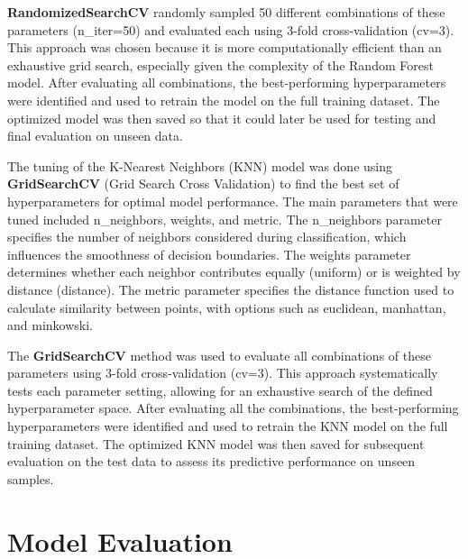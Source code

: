 \textbf{RandomizedSearchCV} randomly sampled 50 different combinations of these parameters (n\_iter=50) and evaluated each using 3-fold cross-validation (cv=3). This approach was chosen because it is more 
computationally efficient than an exhaustive grid search, especially given the complexity of the Random Forest model. After evaluating all combinations, the best-performing hyperparameters were identified and 
used to retrain the model on the full training dataset. The optimized model was then saved so that it could later be used for testing and final evaluation on unseen data.


The tuning of the K-Nearest Neighbors (KNN) model was done using \textbf{GridSearchCV} (Grid Search Cross Validation) to find the best set of hyperparameters for optimal model performance. The main parameters 
that were tuned included n\_neighbors, weights, and metric. The n\_neighbors parameter specifies the number of neighbors considered during classification, which influences the smoothness of decision boundaries. 
The weights parameter determines whether each neighbor contributes equally (uniform) or is weighted by distance (distance). The metric parameter specifies the distance function used to calculate similarity 
between points, with options such as euclidean, manhattan, and minkowski.

The \textbf{GridSearchCV} method was used to evaluate all combinations of these parameters using 3-fold cross-validation (cv=3). This approach systematically tests each parameter setting, allowing for an 
exhaustive search of the defined hyperparameter space. After evaluating all the combinations, the best-performing hyperparameters were identified and used to retrain the KNN model on the full training dataset. 
The optimized KNN model was then saved for subsequent evaluation on the test data to assess its predictive performance on unseen samples.


\clearpage

\chapter{Model Evaluation}


